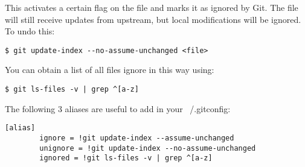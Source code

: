 \documentclass{../../common/tufte-latex/tufte-handout}
\begin{document}
This activates a certain flag on the file and marks it as ignored by Git.
The file will still receive updates from upstream, but local modifications will be ignored.
To undo this:

\begin{lstlisting}[style=BashInputStyle]
  $ git update-index --no-assume-unchanged <file>
\end{lstlisting}

You can obtain a list of all files ignore in this way using:

\begin{lstlisting}[style=BashInputStyle]
  $ git ls-files -v | grep ^[a-z]
\end{lstlisting}

The following 3 aliases are useful to add in your ~/.gitconfig:

\begin{lstlisting}[style=BashInputStyle]
[alias]
        ignore = !git update-index --assume-unchanged 
        unignore = !git update-index --no-assume-unchanged
        ignored = !git ls-files -v | grep ^[a-z]
\end{lstlisting}



\end{document}
